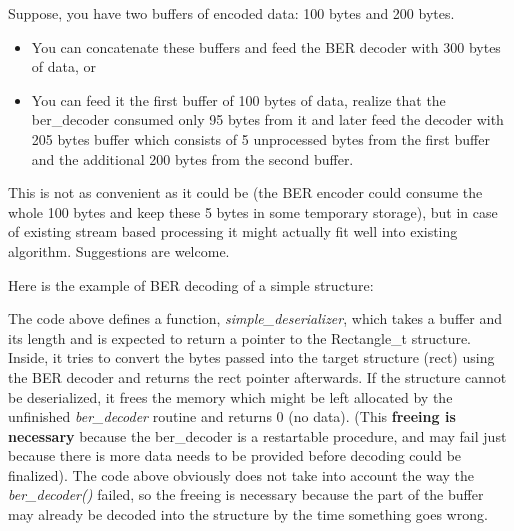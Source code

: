 \documentclass[english,oneside,12pt]{book}
\begin{document}
Suppose, you have two buffers of encoded data: 100 bytes and 200 bytes.
\begin{itemize}
\item You can concatenate these buffers and feed the BER decoder with 300
bytes of data, or
\item You can feed it the first buffer of 100 bytes of data, realize that
the ber\_decoder consumed only 95 bytes from it and later feed the
decoder with 205 bytes buffer which consists of 5 unprocessed bytes
from the first buffer and the additional 200 bytes from the second
buffer.
\end{itemize}
This is not as convenient as it could be (the BER encoder could
consume the whole 100 bytes and keep these 5 bytes in some temporary
storage), but in case of existing stream based processing it might
actually fit well into existing algorithm. Suggestions are welcome.

Here is the example of BER decoding of a simple structure:


The code above defines a function, \emph{simple\_deserializer}, which
takes a buffer and its length and is expected to return a pointer
to the Rectangle\_t structure. Inside, it tries to convert the bytes
passed into the target structure (rect) using the BER decoder and
returns the rect pointer afterwards. If the structure cannot be deserialized,
it frees the memory which might be left allocated by the unfinished
\emph{ber\_decoder} routine and returns 0 (no data). (This \textbf{freeing
is necessary} because the ber\_decoder is a restartable procedure,
and may fail just because there is more data needs to be provided
before decoding could be finalized). The code above obviously does
not take into account the way the \emph{ber\_decoder()} failed, so
the freeing is necessary because the part of the buffer may already
be decoded into the structure by the time something goes wrong.
\end{document}
